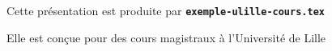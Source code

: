   \item Cette présentation est produite par \texttt{\textbf{exemple-ulille-cours.tex}}
  \item Elle est conçue pour des cours magistraux à l'Université de Lille
